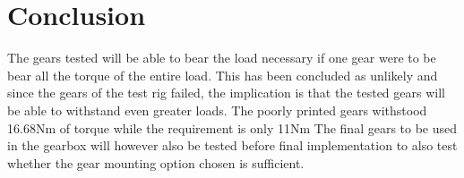\section{Conclusion}
\label{sec:conclustion}

\par
The gears tested will be able to bear the load necessary if one gear were to be bear all the torque of the entire load. This has been concluded as unlikely and since the gears of the test rig failed, the implication is that the tested gears will be able to withstand even greater loads. The poorly printed gears withstood 16.68Nm of torque while the requirement is only 11Nm The final gears to be used in the gearbox will however also be tested before final implementation to also test whether the gear mounting option chosen is sufficient.